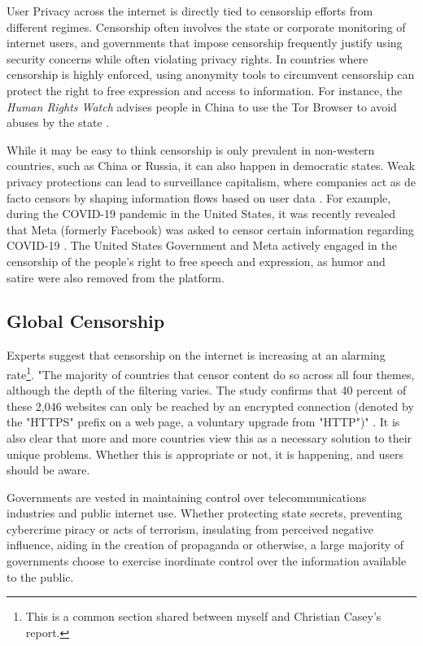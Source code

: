 User Privacy across the internet is directly tied to censorship efforts from different regimes. Censorship often involves the state or corporate monitoring of internet users, and governments that impose censorship frequently justify using security concerns while often violating privacy rights. In countries where censorship is highly enforced, using anonymity tools to circumvent censorship can protect the right to free expression and access to information. For instance, the \textit{Human Rights Watch} advises people in China to use the Tor Browser to avoid abuses by the state \cite{Privacy2017}.

While it may be easy to think censorship is only prevalent in non-western countries, such as China or Russia, it can also happen in democratic states. Weak privacy protections can lead to surveillance capitalism, where companies act as de facto censors by shaping information flows based on user data \cite{schwartz1999internet}. For example, during the COVID-19 pandemic in the United States, it was recently revealed that Meta (formerly Facebook) was asked to censor certain information regarding COVID-19 \cite{pbsZuckerbergSays}. The United States Government and Meta actively engaged in the censorship of the people's right to free speech and expression, as humor and satire were also removed from the platform.

\subsection{Global Censorship}
\label{sec:Chris-Global-Censorship}

Experts suggest that censorship on the internet is increasing at an alarming rate\footnote{This is a common section shared between myself and Christian Casey’s report.}. "The majority of countries that censor content do so across all four themes, although the depth of the filtering varies. The study confirms that 40 percent of these 2,046 websites can only be reached by an 
encrypted connection (denoted by the "HTTPS" prefix on a web page, a voluntary upgrade from "HTTP")" \cite{zittrain2017shifting}. It is also clear that more and more countries view this as a necessary solution to their unique problems. Whether this is appropriate or not, it is happening, and users should be aware. 

Governments are vested in maintaining control over telecommunications industries and public internet use. Whether protecting state secrets, preventing cybercrime piracy or acts of terrorism, insulating from perceived negative influence, aiding in the creation of propaganda or otherwise, a large majority of governments choose to exercise inordinate control over the 
information available to the public.  

